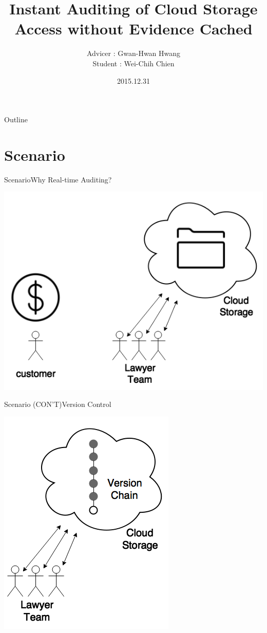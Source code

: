 \documentclass{beamer}
\title[Progress Report]{Instant Auditing of Cloud Storage Access without Evidence Cached}
\author[Wei-Chih Chien]{Advicer : Gwan-Hwan Hwang\\ Student : Wei-Chih Chien}
\institute[NTNU CSIE CCLAB]{NTNU CSIE CCLAB}
\date{2015.12.31}
\begin{document}
\begin{CJK}{UTF8}{bkai}
\begin{frame}
  \titlepage
\end{frame}

\begin{frame}{Outline}
  \tableofcontents
\end{frame}

\section{Scenario}
\begin{frame}{Scenario}{Why Real-time Auditing?}
	\begin{center}
	\includegraphics[width=.7\textwidth]{Scenario1.png}
	\end{center}
\end{frame}

\begin{frame}{Scenario (CON'T)}{Version Control}
	\begin{center}
	\includegraphics[width=.4\textwidth]{Scenario2.png}
	\end{center}
\end{frame}


\end{CJK}
\end{document}
